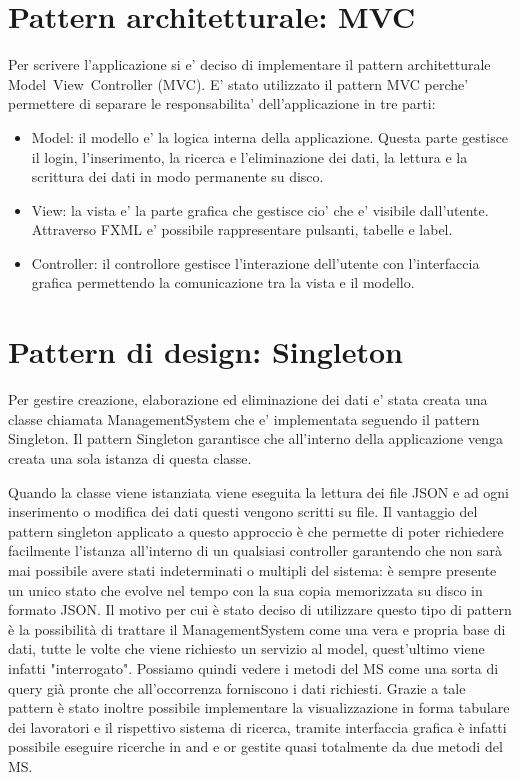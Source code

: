 \documentclass[ 4paper,11pt,openany]{book}
\begin{document}
\section{Pattern architetturale: MVC}
Per scrivere l'applicazione si e' deciso di implementare il pattern architetturale Model~View~Controller (MVC).
E' stato utilizzato il pattern MVC perche' permettere di separare le responsabilita' dell'applicazione in tre parti:
\begin{itemize}
    \item Model: il modello e' la logica interna della applicazione. Questa parte gestisce il login, l'inserimento, la ricerca e l'eliminazione dei dati, la lettura e la scrittura dei dati in modo permanente su disco.
    \item View: la vista e' la parte grafica che gestisce cio' che e' visibile dall'utente. Attraverso FXML e' possibile rappresentare pulsanti, tabelle e label.
    \item Controller: il controllore gestisce l'interazione dell'utente con l'interfaccia grafica permettendo la comunicazione tra la vista e il modello.
\end{itemize}

\section{Pattern di design: Singleton}
Per gestire creazione, elaborazione ed eliminazione dei dati e' stata creata una classe chiamata ManagementSystem che e' implementata seguendo il pattern Singleton.
Il pattern Singleton garantisce che all'interno della applicazione venga creata una sola istanza di questa classe.

Quando la classe viene istanziata viene eseguita la lettura dei file JSON e ad ogni inserimento o modifica dei dati questi vengono scritti su file.
Il vantaggio del pattern singleton applicato a questo approccio è che permette di poter richiedere facilmente l'istanza all'interno di un qualsiasi controller garantendo che non sarà mai possibile avere stati indeterminati o multipli del sistema: è sempre presente un unico stato che evolve nel tempo con la sua copia memorizzata su disco in formato JSON.
Il motivo per cui è stato deciso di utilizzare questo tipo di pattern è la possibilità di trattare il ManagementSystem come una vera e propria base di dati, tutte le volte che viene richiesto un servizio al model, quest'ultimo viene infatti "interrogato". Possiamo quindi vedere i metodi del MS come una sorta di query già pronte che all'occorrenza forniscono i dati richiesti. Grazie a tale pattern è stato inoltre possibile implementare la visualizzazione in forma tabulare dei lavoratori e il rispettivo sistema di ricerca, tramite interfaccia grafica è infatti possibile eseguire ricerche in and e or gestite quasi totalmente da due metodi del MS.
\end{document}
